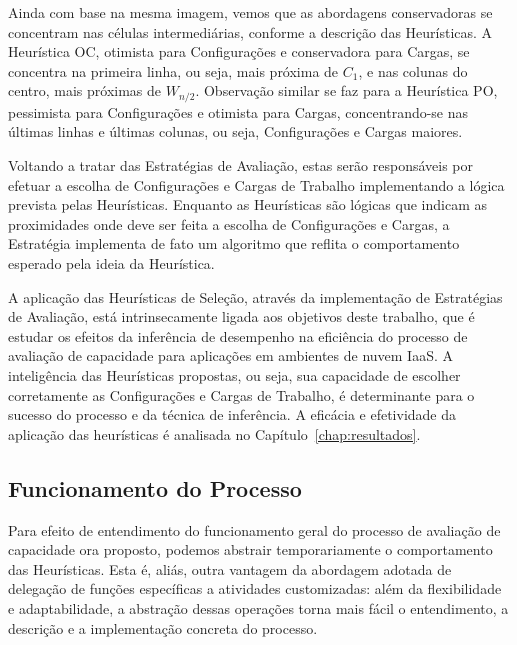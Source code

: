 \documentclass[12pt]{article}
\begin{document}
Ainda com base na mesma imagem, vemos que as abordagens conservadoras se concentram
nas células intermediárias, conforme a descrição das Heurísticas. A Heurística
OC, otimista para Configurações e conservadora para Cargas, se concentra na 
primeira linha, ou seja, mais próxima de $C_1$, e nas colunas do centro, mais
próximas de $W_{n/2}$. Observação similar se faz para a Heurística PO, pessimista 
para Configurações e otimista para Cargas, concentrando-se nas últimas linhas e 
últimas colunas, ou seja, Configurações e Cargas maiores.

Voltando a tratar das Estratégias de Avaliação, estas serão responsáveis por efetuar
a escolha de Configurações e Cargas de Trabalho implementando a lógica prevista pelas
Heurísticas. Enquanto as Heurísticas são lógicas que indicam as proximidades onde 
deve ser feita a escolha de Configurações e Cargas, a Estratégia implementa de fato
um algoritmo que reflita o comportamento esperado pela ideia da Heurística.
 
A aplicação das Heurísticas de Seleção, através da implementação de Estratégias 
de Avaliação, está intrinsecamente ligada aos objetivos deste trabalho, que é estudar 
os efeitos da inferência de desempenho na eficiência do processo de avaliação de 
capacidade para aplicações em ambientes de nuvem IaaS. A inteligência 
das Heurísticas propostas, ou seja, sua capacidade de escolher corretamente as 
Configurações e Cargas de Trabalho, é determinante para o sucesso do processo e 
da técnica de inferência. A eficácia e efetividade da aplicação das heurísticas
é analisada no Capítulo~\ref{chap:resultados}. 

\subsection{Funcionamento do Processo}
\label{sec:funcionamento_processo}
Para efeito de entendimento do funcionamento geral do processo de avaliação de 
capacidade ora proposto, podemos abstrair temporariamente o comportamento das 
Heurísticas. Esta é, aliás, outra vantagem da abordagem adotada de 
delegação de funções específicas a atividades customizadas: além da flexibilidade e 
adaptabilidade, a abstração dessas operações torna mais fácil o entendimento, 
a descrição e a implementação concreta do processo.
\end{document}

